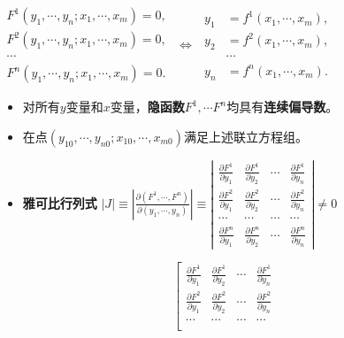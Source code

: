 \documentclass[12pt, a4paper, oneside]{article}
\begin{document}
\begin{CJK*}{UTF8}{gbsn}
$
\begin{array}{c}
F^{1}\left(y_{1}, \cdots, y_{n} ; x_{1}, \cdots, x_{m}\right)=0, \\ 
F^{2}\left(y_{1}, \cdots, y_{n} ; x_{1}, \cdots, x_{m}\right)=0, \\ 
\cdots \\ 
F^{n}\left(y_{1}, \cdots, y_{n} ; x_{1}, \cdots, x_{m}\right)=0.
\end{array}
$
$\Leftrightarrow$
$
\begin{aligned}
y_{1}&=f^{1}\left(x_{1}, \cdots, x_{m}\right), \\ 
y_{2}&=f^{2}\left(x_{1}, \cdots, x_{m}\right), \\  
 &\cdots    \\ 
y_{n}&=f^{n}\left(x_{1}, \cdots, x_{m}\right) .
\end{aligned}
$
\begin{itemize}
	\item 对所有$y$变量和$x$变量，\textbf{隐函数}$F^1,\cdots F^n$均具有\textbf{连续偏导数}。
	\item 在点$\left(y_{10}, \cdots, y_{n0} ; x_{10}, \cdots, x_{m0}\right)$满足上述联立方程组。
	\item \textbf{雅可比行列式}
	$
	|J| \equiv\left|\frac{\partial\left(F^{1}, \cdots, F^{n}\right)}{\partial\left(y_{1}, \cdots, y_{n}\right)}\right| \equiv\left|\begin{array}{cccc}\frac{\partial F^{1}}{\partial y_{1}} & \frac{\partial F^{1}}{\partial y_{2}} & \cdots & \frac{\partial F^{1}}{\partial y_{n}} \\ \frac{\partial F^{2}}{\partial y_{1}} & \frac{\partial F^{2}}{\partial y_{2}} & \cdots & \frac{\partial F^{2}}{\partial y_{n}} \\ \cdots &\cdots &\cdots &\cdots  \\ \frac{\partial F^{n}}{\partial y_{1}} & \frac{\partial F^{n}}{\partial y_{2}} & \cdots & \frac{\partial F^{n}}{\partial y_{n}}\end{array}\right| \neq 0
	$
\end{itemize}
$$
\left[
	\begin{array}{cccc}
		\frac{\partial F^{1}}{\partial y_{1}} & \frac{\partial F^{1}}{\partial y_{2}} & \cdots & \frac{\partial F^{1}}{\partial y_{n}} \\
		\frac{\partial F^{2}}{\partial y_{1}} & \frac{\partial F^{2}}{\partial y_{2}} & \cdots & \frac{\partial F^{2}}{\partial y_{n}} \\
		 \cdots &\cdots &\cdots &\cdots \\

\end{array}$$
\end{CJK*}
\end{document}
